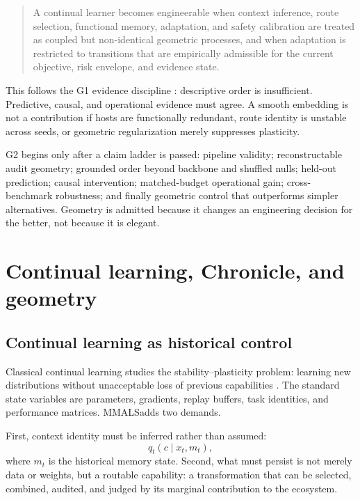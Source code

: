 \documentclass[11pt,a4paper]{article}
\newcommand{\MMALS}{\textsc{MMALS}}
\begin{document}
\begin{quote}
A continual learner becomes engineerable when context inference, route selection, functional memory, adaptation, and safety calibration are treated as coupled but non-identical geometric processes, and when adaptation is restricted to transitions that are empirically admissible for the current objective, risk envelope, and evidence state.
\end{quote}

This follows the G1 evidence discipline \cite{geometrymmalsg1}: descriptive order is insufficient. Predictive, causal, and operational evidence must agree. A smooth embedding is not a contribution if hosts are functionally redundant, route identity is unstable across seeds, or geometric regularization merely suppresses plasticity.

G2 begins only after a claim ladder is passed: pipeline validity; reconstructable audit geometry; grounded order beyond backbone and shuffled nulls; held-out prediction; causal intervention; matched-budget operational gain; cross-benchmark robustness; and finally geometric control that outperforms simpler alternatives. Geometry is admitted because it changes an engineering decision for the better, not because it is elegant.

\section{Continual learning, Chronicle, and geometry}
\subsection{Continual learning as historical control}
Classical continual learning studies the stability--plasticity problem: learning new distributions without unacceptable loss of previous capabilities \cite{kirkpatrick2017ewc,parisi2019cl}. The standard state variables are parameters, gradients, replay buffers, task identities, and performance matrices. \MMALS adds two demands.

First, context identity must be inferred rather than assumed:
\begin{equation}
q_t(c\mid x_t,m_t),
\end{equation}
where $m_t$ is the historical memory state. Second, what must persist is not merely data or weights, but a routable capability: a transformation that can be selected, combined, audited, and judged by its marginal contribution to the ecosystem.
\end{document}
